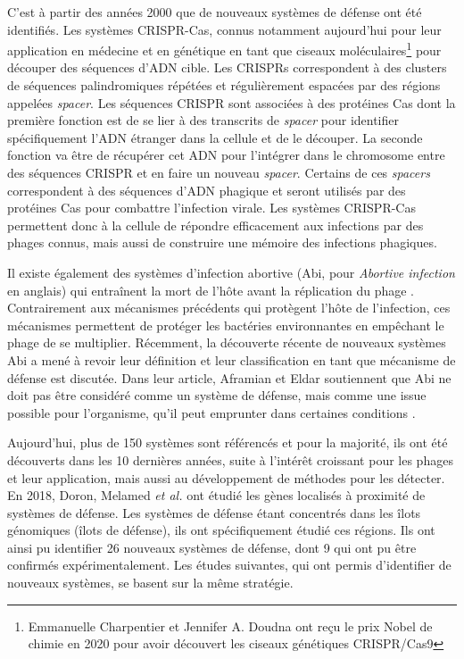C'est à partir des années 2000 que de nouveaux systèmes de défense ont été identifiés. Les systèmes CRISPR-Cas, connus notamment aujourd'hui pour leur application en médecine et en génétique en tant que ciseaux moléculaires\cite{haft_guild_2005,barrangou_crispr_2007}\footnote{Emmanuelle Charpentier et Jennifer A. Doudna ont reçu le prix Nobel de chimie en 2020 pour avoir découvert les ciseaux génétiques CRISPR/Cas9} pour découper des séquences d'ADN cible. Les CRISPRs correspondent à des clusters de séquences palindromiques répétées et régulièrement espacées par des régions appelées \textit{spacer}. Les séquences CRISPR sont associées à des protéines Cas dont la première fonction est de se lier à des transcrits de \textit{spacer} pour identifier spécifiquement l'ADN étranger dans la cellule et de le découper. La seconde fonction va être de récupérer cet ADN pour l'intégrer dans le chromosome entre des séquences CRISPR et en faire un nouveau \textit{spacer}. Certains de ces \textit{spacers} correspondent à des séquences d'ADN phagique et seront utilisés par des protéines Cas pour combattre l'infection virale. Les systèmes CRISPR-Cas permettent donc à la cellule de répondre efficacement aux infections par des phages connus, mais aussi de construire une mémoire des infections phagiques.

Il existe également des systèmes d'infection abortive (Abi, pour \textit{Abortive infection} en anglais) qui entraînent la mort de l'hôte avant la réplication du phage \cite{molineux_host-parasite_1991}. Contrairement aux mécanismes précédents qui protègent l'hôte de l'infection, ces mécanismes permettent de protéger les bactéries environnantes en empêchant le phage de se multiplier. Récemment, la découverte récente de nouveaux systèmes Abi a mené à revoir leur définition et leur classification en tant que mécanisme de défense est discutée. Dans leur article, Aframian et Eldar soutiennent que Abi ne doit pas être considéré comme un système de défense, mais comme une issue possible pour l'organisme, qu'il peut emprunter dans certaines conditions \cite{aframian_abortive_2023}.

Aujourd'hui, plus de 150 systèmes sont référencés et pour la majorité, ils ont été découverts dans les 10 dernières années, suite à l'intérêt croissant pour les phages et leur application, mais aussi au développement de méthodes pour les détecter. En 2018, Doron, Melamed \textit{et al.} \cite{doron_systematic_2018} ont étudié les gènes localisés à proximité de systèmes de défense. Les systèmes de défense étant concentrés dans les îlots génomiques (îlots de défense)\cite{makarova_defense_2011}, ils ont spécifiquement étudié ces régions. Ils ont ainsi pu identifier 26 nouveaux systèmes de défense, dont 9 qui ont pu être confirmés expérimentalement. Les études suivantes, qui ont permis d'identifier de nouveaux systèmes, se basent sur la même stratégie.

